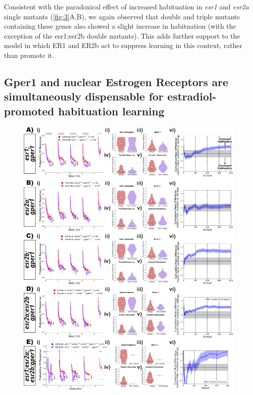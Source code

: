 \documentclass[9pt,lineno]{RandlettLab_elife}
\begin{document}
{Consistent with the paradoxical effect of increased habituation in \emph{esr1} and \emph{esr2a} single mutants (\autoref{fig:3}A,B), we again observed that double and triple mutants containing these genes also showed a slight increase in habituation (with the exception of the {esr1;esr2b} double mutants).
This adds further support to the model in which ER1 and ER2b act to suppress learning in this context, rather than promote it. 


\subsection{Gper1 and nuclear Estrogen Receptors are simultaneously dispensable for estradiol-promoted habituation learning}

\begin{figure}
\begin{fullwidth}
\begin{center}
\includegraphics[width=0.8\linewidth]{figures/gper1andNuclearMutants.png}


\end{center}
\end{fullwidth}
\end{figure}}
\end{document}
